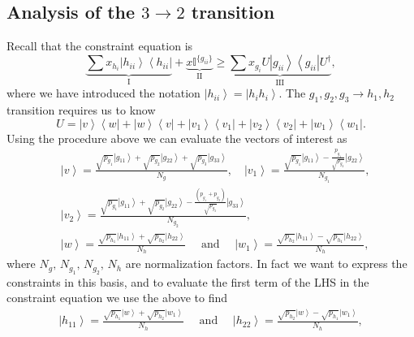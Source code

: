 \documentclass{article}
\begin{document}
\subsection{Analysis of the \texorpdfstring{$3\rightarrow 2$}{3 -> 2} transition}
\label{subsec:appendix3to2}
Recall that the constraint equation is 
\begin{displaymath}
\underbrace{\sum x_{h_{i}}\left|h_{ii}\right\rangle \left\langle h_{ii}\right|}_{\text{I}}+\underbrace{x\mathbb{I}^{\{g_{ii}\}}}_{\text{II}}\ge\underbrace{\sum x_{g_{i}}U\left|g_{ii}\right\rangle \left\langle g_{ii}\right|U^{\dagger}}_{\text{III}},
\end{displaymath}
where we have introduced the notation $\left|h_{ii}\right\rangle =\left|h_{i}h_{i}\right\rangle $. The $g_{1},g_{2},g_{3}\to h_{1},h_{2}$
transition requires us to know 
\begin{displaymath}
U=\left|v\right\rangle \left\langle w\right|+\left|w\right\rangle \left\langle v\right|+\left|v_{1}\right\rangle \left\langle v_{1}\right|+\left|v_{2}\right\rangle \left\langle v_{2}\right|+\left|w_{1}\right\rangle \left\langle w_{1}\right|.
\end{displaymath}
Using the procedure above we can evaluate the vectors of interest as
\begin{align*}
&\left|v\right\rangle   =\frac{\sqrt{p_{g_{1}}}\left|g_{11}\right\rangle +\sqrt{p_{g_{2}}}\left|g_{22}\right\rangle +\sqrt{p_{g_{3}}}\left|g_{33}\right\rangle }{N_{g}},\quad
\left|v_{1}\right\rangle   =\frac{\sqrt{p_{g_{1}}}\left|g_{11}\right\rangle -\frac{p_{g_{1}}}{\sqrt{p_{g_{2}}}}\left|g_{22}\right\rangle }{N_{g_{1}}},\\
&\left|v_{2}\right\rangle   =\frac{\sqrt{p_{g_{1}}}\left|g_{11}\right\rangle +\sqrt{p_{g_{2}}}\left|g_{22}\right\rangle -\frac{\left(p_{g_{1}}+p_{g_{2}}\right)}{\sqrt{p_{g_{3}}}}\left|g_{33}\right\rangle }{N_{g_{2}}},\\
&\left|w\right\rangle   =\frac{\sqrt{p_{h_{1}}}\left|h_{11}\right\rangle +\sqrt{p_{h_{2}}}\left|h_{22}\right\rangle }{N_{h}}\quad\text{ and }\quad
\left|w_{1}\right\rangle   =\frac{\sqrt{p_{h_{2}}}\left|h_{11}\right\rangle -\sqrt{p_{h_{1}}}\left|h_{22}\right\rangle }{N_{h}},
\end{align*}
where $N_{g},\,N_{g_{1}},\,N_{g_{2}},\,N_{h}$ are normalization factors.
In fact we want to express the constraints in this basis, and to evaluate
the first term of the LHS in the constraint equation we use the above to find 
\begin{align*}
\left|h_{11}\right\rangle   =\frac{\sqrt{p_{h_{1}}}\left|w\right\rangle +\sqrt{p_{h_{2}}}\left|w_{1}\right\rangle }{N_{h}}\quad \text{ and }\quad
\left|h_{22}\right\rangle   =\frac{\sqrt{p_{h_{2}}}\left|w\right\rangle -\sqrt{p_{h_{1}}}\left|w_{1}\right\rangle }{N_{h}},
\end{align*}
\end{document}

